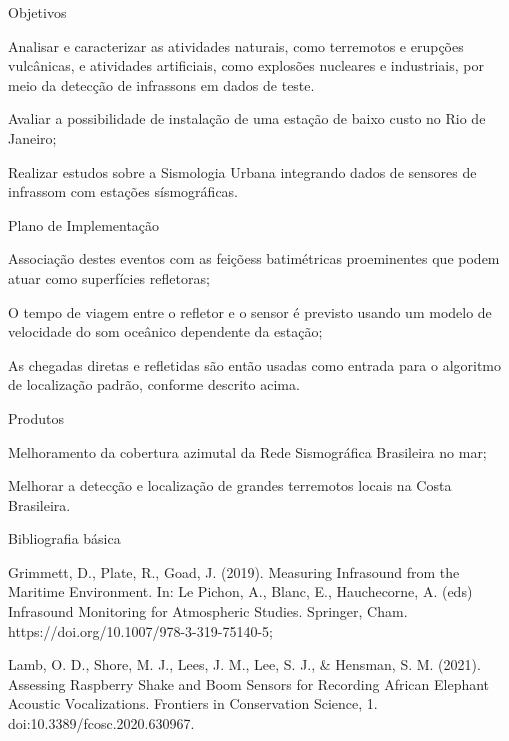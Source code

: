 \documentclass[10pt,a4paper,oneside]{book}
\begin{document}
\begin{fancyenum}{\faFutbol}{Objetivos}
	\item Analisar e caracterizar as atividades naturais, como terremotos e erupções vulcânicas, e atividades artificiais, como explosões nucleares e industriais, por meio da detecção de infrassons em dados de teste.
	\item Avaliar a possibilidade de instalação de uma estação de baixo custo no Rio de Janeiro;
	\item Realizar estudos sobre a Sismologia Urbana integrando dados de sensores de infrassom com estações sísmográficas.
\end{fancyenum}

\begin{fancyenum}{\faBrain}{Plano de Implementação}
	\item Associação destes eventos com as feiçõess batimétricas proeminentes que podem atuar como superfícies refletoras;
	\item O tempo de viagem entre o refletor e o sensor é previsto usando um modelo de velocidade do som oceânico dependente da estação;
	\item As chegadas diretas e refletidas são então usadas como entrada para o algoritmo de localização padrão, conforme descrito acima.
\end{fancyenum}

\begin{fancyenum}{\faShoppingCart}{Produtos}
	\item Melhoramento da cobertura azimutal da Rede Sismográfica Brasileira no mar;
	\item Melhorar a detecção e localização de grandes terremotos locais na Costa Brasileira.
\end{fancyenum}

\begin{fancyenum}{\faBook}{Bibliografia básica}
	\item Grimmett, D., Plate, R., Goad, J. (2019). Measuring Infrasound from the Maritime Environment. In: Le Pichon, A., Blanc, E., Hauchecorne, A. (eds) Infrasound Monitoring for Atmospheric Studies. Springer, Cham. https://doi.org/10.1007/978-3-319-75140-5;
	\item Lamb, O. D., Shore, M. J., Lees, J. M., Lee, S. J., \& Hensman, S. M. (2021). Assessing Raspberry Shake and Boom Sensors for Recording African Elephant Acoustic Vocalizations. Frontiers in Conservation Science, 1. doi:10.3389/fcosc.2020.630967.
\end{fancyenum}
\end{document}

